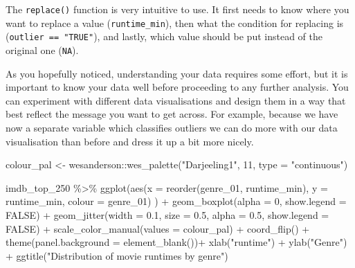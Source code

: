 \documentclass[
]{book}
\newenvironment{Shaded}{\begin{snugshade}}{\end{snugshade}}
\newcommand{\AttributeTok}[1]{\textcolor[rgb]{0.77,0.63,0.00}{#1}}
\newcommand{\ConstantTok}[1]{\textcolor[rgb]{0.00,0.00,0.00}{#1}}
\newcommand{\DecValTok}[1]{\textcolor[rgb]{0.00,0.00,0.81}{#1}}
\newcommand{\FloatTok}[1]{\textcolor[rgb]{0.00,0.00,0.81}{#1}}
\newcommand{\FunctionTok}[1]{\textcolor[rgb]{0.00,0.00,0.00}{#1}}
\newcommand{\NormalTok}[1]{#1}
\newcommand{\OtherTok}[1]{\textcolor[rgb]{0.56,0.35,0.01}{#1}}
\newcommand{\SpecialCharTok}[1]{\textcolor[rgb]{0.00,0.00,0.00}{#1}}
\newcommand{\StringTok}[1]{\textcolor[rgb]{0.31,0.60,0.02}{#1}}
\begin{document}
The \texttt{replace()} function is very intuitive to use. It first needs to know where you want to replace a value (\texttt{runtime\_min}), then what the condition for replacing is (\texttt{outlier\ ==\ "TRUE"}), and lastly, which value should be put instead of the original one (\texttt{NA}).

As you hopefully noticed, understanding your data requires some effort, but it is important to know your data well before proceeding to any further analysis. You can experiment with different data visualisations and design them in a way that best reflect the message you want to get across. For example, because we have now a separate variable which classifies outliers we can do more with our data visualisation than before and dress it up a bit more nicely.

\begin{Shaded}
\begin{Highlighting}[]
\NormalTok{colour\_pal }\OtherTok{\textless{}{-}}\NormalTok{ wesanderson}\SpecialCharTok{::}\FunctionTok{wes\_palette}\NormalTok{(}\StringTok{"Darjeeling1"}\NormalTok{, }\DecValTok{11}\NormalTok{, }\AttributeTok{type =} \StringTok{"continuous"}\NormalTok{)}

\NormalTok{imdb\_top\_250 }\SpecialCharTok{\%\textgreater{}\%} 
  \FunctionTok{ggplot}\NormalTok{(}\FunctionTok{aes}\NormalTok{(}\AttributeTok{x =} \FunctionTok{reorder}\NormalTok{(genre\_01, runtime\_min),}
             \AttributeTok{y =}\NormalTok{ runtime\_min,}
             \AttributeTok{colour =}\NormalTok{ genre\_01)}
\NormalTok{         ) }\SpecialCharTok{+}
  \FunctionTok{geom\_boxplot}\NormalTok{(}\AttributeTok{alpha =} \DecValTok{0}\NormalTok{,}
               \AttributeTok{show.legend =} \ConstantTok{FALSE}\NormalTok{) }\SpecialCharTok{+}
  \FunctionTok{geom\_jitter}\NormalTok{(}\AttributeTok{width =} \FloatTok{0.1}\NormalTok{,}
              \AttributeTok{size =} \FloatTok{0.5}\NormalTok{,}
              \AttributeTok{alpha =} \FloatTok{0.5}\NormalTok{,}
              \AttributeTok{show.legend =} \ConstantTok{FALSE}\NormalTok{) }\SpecialCharTok{+}
  \FunctionTok{scale\_color\_manual}\NormalTok{(}\AttributeTok{values =}\NormalTok{ colour\_pal) }\SpecialCharTok{+}
  \FunctionTok{coord\_flip}\NormalTok{() }\SpecialCharTok{+}
  \FunctionTok{theme}\NormalTok{(}\AttributeTok{panel.background =} \FunctionTok{element\_blank}\NormalTok{())}\SpecialCharTok{+}
  \FunctionTok{xlab}\NormalTok{(}\StringTok{"runtime"}\NormalTok{) }\SpecialCharTok{+}
  \FunctionTok{ylab}\NormalTok{(}\StringTok{"Genre"}\NormalTok{) }\SpecialCharTok{+}
  \FunctionTok{ggtitle}\NormalTok{(}\StringTok{"Distribution of movie runtimes by genre"}\NormalTok{)}
\end{Highlighting}
\end{Shaded}
\end{document}

